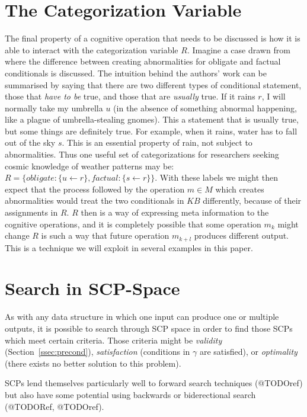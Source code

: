 \documentclass[
11pt, %
english, %
singlespacing, %
headsepline, %
]{MastersDoctoralThesis} %
\begin{document}
\section{The Categorization Variable}
The final property of a cognitive operation that needs to be discussed is how it is able to interact with the categorization variable $R$. Imagine a case drawn from \cite{saldanha2017weak} where the difference between creating abnormalities for obligate and factual conditionals is discussed. The intuition behind the authors' work can be summarised by saying that there are two different types of conditional statement, those that \textit{have to be} true, and those that are \textit{usually} true. If it rains $r$, I will normally take my umbrella $u$ (in the absence of something abnormal happening, like a plague of umbrella-stealing gnomes). This a statement that is usually true, but some things are definitely true. For example, when it rains, water has to fall out of the sky $s$. This is an essential property of rain, not subject to abnormalities. Thus one useful set of categorizations for researchers seeking cosmic knowledge of weather patterns may be: $R=\{obligate: \{u \leftarrow r\}, factual: \{s \leftarrow r\} \}$. With these labels we might then expect that the process followed by the operation $m \in M$ which creates abnormalities would treat the two conditionals in $KB$ differently, because of their assignments in $R$. $R$ then is a way of expressing meta information to the cognitive operations, and it is completely possible that some operation $m_k$ might change $R$ is such a way that future operation $m_{k+l}$ produces different output. This is a technique we will exploit in several examples in this paper.

\section{Search in SCP-Space}
As with any data structure in which one input can produce one or multiple outputs, it is possible to search through SCP space in order to find those SCPs which meet certain criteria. Those criteria might be \textit{validity} (Section~\ref{ssec:precond}), \textit{satisfaction} (conditions in $\gamma$ are satisfied), or \textit{optimality} (there exists no better solution to this problem).

SCPs lend themselves particularly well to forward search techniques (@TODOref) but also have some potential using backwards or biderectional search (@TODORef, @TODOref). 
\end{document}
